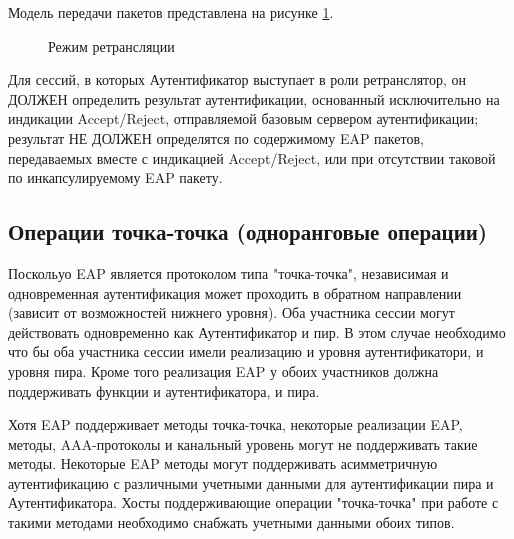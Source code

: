 Модель передачи пакетов представлена на рисунке \ref{img:2}.

\begin{figure}[h]
\caption{Режим ретрансляции}
\label{img:2}
\end{figure}

Для сессий, в которых Аутентификатор выступает в роли ретранслятор, он ДОЛЖЕН определить результат аутентификации, основанный исключительно на индикации Accept/Reject, отправляемой базовым сервером аутентификации; результат НЕ ДОЛЖЕН определятся по содержимому EAP пакетов, передаваемых вместе с индикацией Accept/Reject, или при отсутствии таковой по инкапсулируемому EAP пакету.

\subsection{Операции точка-точка (одноранговые операции)}

Поскольуо EAP является протоколом типа "точка-точка", независимая и одновременная аутентификация может проходить в обратном направлении (зависит от возможностей нижнего уровня). Оба участника сессии могут действовать одновременно как Аутентификатор и пир. В этом случае необходимо что бы оба участника сессии имели реализацию и уровня аутентификатори, и уровня пира. Кроме того реализация EAP у обоих участников должна поддерживать функции и аутентификатора, и пира.

Хотя EAP поддерживает методы точка-точка, некоторые реализации EAP, методы, AAA-протоколы и канальный уровень могут не поддерживать такие методы. Некоторые EAP методы могут поддерживать асимметричную аутентификацию с различными учетными данными для аутентификации пира и Аутентификатора. Хосты поддерживающие операции "точка-точка" при работе с такими методами необходимо снабжать учетными данными обоих типов.

